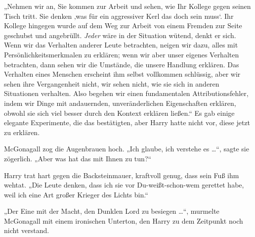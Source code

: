 „Nehmen wir an, Sie kommen zur Arbeit und sehen, wie Ihr Kollege gegen seinen Tisch tritt. Sie denken ‚was für ein aggressiver Kerl das doch sein muss‘. Ihr Kollege hingegen wurde auf dem Weg zur Arbeit von einem Fremden zur Seite geschubst und angebrüllt. \emph{Jeder} wäre in der Situation wütend, denkt er sich. Wenn wir das Verhalten anderer Leute betrachten, neigen wir dazu, alles mit Persönlichkeitsmerkmalen zu erklären; wenn wir aber unser eigenes Verhalten betrachten, dann sehen wir die Umstände, die unsere Handlung erklären. Das Verhalten eines Menschen erscheint ihm selbst vollkommen schlüssig, aber wir sehen ihre Vergangenheit nicht, wir sehen nicht, wie sie sich in anderen Situationen verhalten. Also begehen wir einen fundamentalen Attributionsfehler, indem wir Dinge mit andauernden, unveränderlichen Eigenschaften erklären, obwohl sie sich viel besser durch den Kontext erklären ließen.“ Es gab einige elegante Experimente, die das bestätigten, aber Harry hatte nicht vor, diese jetzt zu erklären.

McGonagall zog die Augenbrauen hoch.
„Ich glaube, ich verstehe es …“, sagte sie zögerlich.
„Aber was hat das mit Ihnen zu tun?“

Harry trat hart gegen die Backsteinmauer, kraftvoll genug, dass sein Fuß ihm wehtat.
„Die Leute denken, dass ich sie vor Du-weißt-schon-wem gerettet habe, weil ich eine Art großer Krieger des Lichts bin.“

„Der Eine mit der Macht, den Dunklen Lord zu besiegen …“, murmelte McGonagall mit einem ironischen Unterton, den Harry zu dem Zeitpunkt noch nicht verstand.

